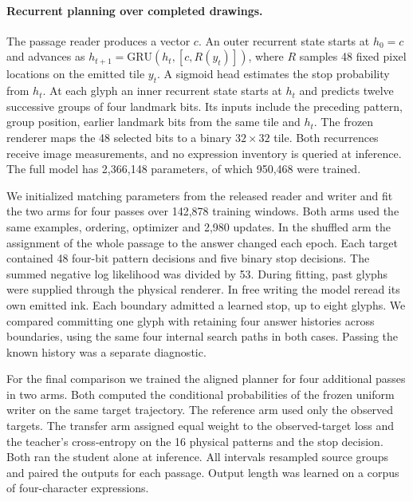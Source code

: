 \documentclass[12pt,a4paper]{article}
\providecommand{\DIFadd}[1]{{\protect\color{blue} \sf #1}} %
\begin{document}
\paragraph{\DIFadd{Recurrent planning over completed drawings.}}
\DIFadd{The passage reader produces a vector $c$. An outer recurrent state starts at $h_0=c$ and advances as $h_{t+1}=\mathrm{GRU}(h_t,[c,R(y_t)])$, where $R$ samples 48 fixed pixel locations on the emitted tile $y_t$. A sigmoid head estimates the stop probability from $h_t$. At each glyph an inner recurrent state starts at $h_t$ and predicts twelve successive groups of four landmark bits. Its inputs include the preceding pattern, group position, earlier landmark bits from the same tile and $h_t$. The frozen renderer maps the 48 selected bits to a binary $32\times32$ tile. Both recurrences receive image measurements, and no expression inventory is queried at inference. The full model has 2,366,148 parameters, of which 950,468 were trained.
}

\DIFadd{We initialized matching parameters from the released reader and writer and fit the two arms for four passes over 142,878 training windows. Both arms used the same examples, ordering, optimizer and 2,980 updates. In the shuffled arm the assignment of the whole passage to the answer changed each epoch. Each target contained 48 four-bit pattern decisions and five binary stop decisions. The summed negative log likelihood was divided by 53. During fitting, past glyphs were supplied through the physical renderer. In free writing the model reread its own emitted ink. Each boundary admitted a learned stop, up to eight glyphs. We compared committing one glyph with retaining four answer histories across boundaries, using the same four internal search paths in both cases. Passing the known history was a separate diagnostic.
}

\DIFadd{For the final comparison we trained the aligned planner for four additional passes in two arms. Both computed the conditional probabilities of the frozen uniform writer on the same target trajectory. The reference arm used only the observed targets. The transfer arm assigned equal weight to the observed-target loss and the teacher's cross-entropy on the 16 physical patterns and the stop decision. Both ran the student alone at inference. All intervals resampled source groups and paired the outputs for each passage. Output length was learned on a corpus of four-character expressions.
}
\end{document}
